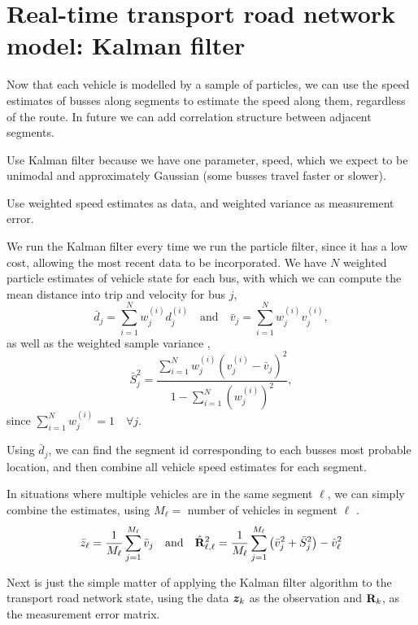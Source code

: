 \documentclass[draftcls,a4paper,onecolumn]{IEEEtran}\usepackage[]{graphicx}\usepackage[]{color}
\begin{document}
\section{Real-time transport road network model: Kalman filter}
\label{sec:kf}

Now that each vehicle is modelled by a sample of particles,
we can use the speed estimates of busses along segments to estimate
the speed along them, regardless of the route.
In future we can add correlation structure between adjacent segments.

Use Kalman filter because we have one parameter, speed, 
which we expect to be unimodal and approximately Gaussian
(some busses travel faster or slower).

Use weighted speed estimates as data,
and weighted variance as measurement error.


We run the Kalman filter every time we run the particle filter,
since it has a low cost, allowing the most recent data to be incorporated.
We have $N$ weighted particle estimates of vehicle state for each bus,
with which we can compute the mean distance into trip and velocity for bus $j$,
\begin{equation}
  \label{eq:weighted_mean}
  \bar d_j = \sum_{i=1}^N w_j^{(i)} d_j^{(i)} \quad\text{and}\quad
  \bar v_j = \sum_{i=1}^N w_j^{(i)} v_j^{(i)},
\end{equation}
as well as the weighted sample variance \cite{cn},
\begin{equation}
  \label{eq:weighted_variance}
  \bar S_j^2 = \frac{\sum_{i=1}^N w_j^{(i)} (v_j^{(i)} - \bar v_j)^2}{1 - \sum_{i=1}^N (w_j^{(i)})^2},
\end{equation}
since $\sum_{i=1}^N w_j^{(i)} = 1\quad \forall j$.

Using $\bar d_j$, we can find the segment id corresponding to each busses most probable location,
and then combine all vehicle speed estimates for each segment.

In situations where multiple vehicles are in the same segment $\ell$, 
we can simply combine the estimates, using $M_\ell = $ number of vehicles in segment $\ell$ 
\cite{cn}.
\begin{equation}
  \label{eq:kf_data_estimates}
  \bar z_\ell = \frac{1}{M_\ell} \sum_{j = 1}^{M_\ell} \bar v_j \quad\text{and}\quad
  \hat {\mathbf{R}}_{\ell,\ell}^2 = \frac{1}{M_\ell} \sum_{j=1}^{M_\ell} \left(\bar v_j^2 + \bar S_j^2\right) - \hat v_\ell^2
\end{equation}

Next is just the simple matter of applying the Kalman filter algorithm to the transport road network state,
using the data $\boldsymbol{z}_k$ as the observation and $\mathbf{R}_k$,
as the measurement error matrix.
\end{document}
